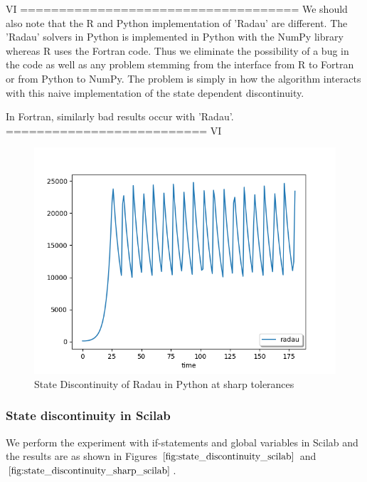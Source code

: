 VI ====================================
We should also note that the R and Python implementation of 'Radau' are different. The 'Radau' solvers in Python is implemented in Python with the NumPy library whereas R uses the Fortran code. Thus we eliminate the possibility of a bug in the code as well as any problem stemming from the interface from R to Fortran or from Python to NumPy. The problem is simply in how the algorithm interacts with this naive implementation of the state dependent discontinuity.

In Fortran, similarly bad results occur with 'Radau'.
========================== VI

\begin{figure}[h]
	\centering
	\includegraphics[width=0.7\linewidth]{./figures/state_discontinuity_sharp_radau_py}
	\caption{State Discontinuity of Radau in Python at sharp tolerances}
	\label{fig:state_discontinuity_sharp_radau_py}
\end{figure}

\subsubsection{State discontinuity in Scilab}
We perform the experiment with if-statements and global variables in Scilab and the results are as shown in Figures $\ref{fig:state_discontinuity_scilab}$ and $\ref{fig:state_discontinuity_sharp_scilab}$.

